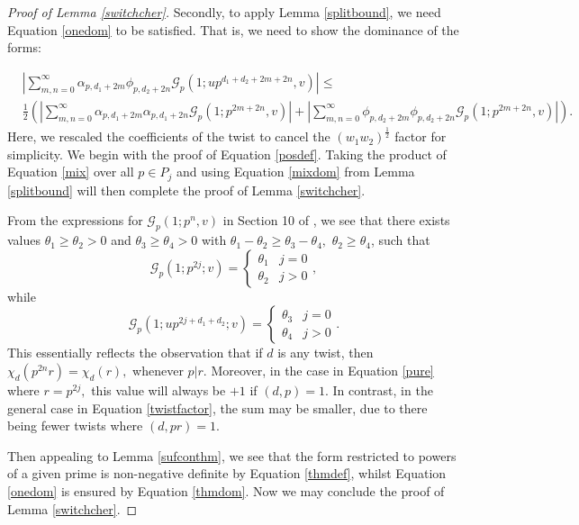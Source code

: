 \documentclass[12pt]{amsart}
\numberwithin{equation}{section}
\numberwithin{thm}{section}
\newcommand{\1}{\mathbf 1}
\begin{document}
\begin{proof}[Proof of Lemma \ref{switchcher}]
		Secondly, to apply Lemma \ref{splitbound}, we need Equation \eqref{onedom}  to be satisfied. That is, we need to show the dominance of the forms:
		
		\begin{align} \label{mix}
			&\nonumber\left|\sum^{\infty}_{m,n=0}\alpha_{p,d_1+2m}\phi_{p,d_2+2n}  \mathcal{G}_p(1;up^{d_1+d_2+2m+2n},v)
			\right|\le\\& \frac{1}{2} \left(\left|\sum^{\infty}_{m,n=0}\alpha_{p,d_1+2m}\alpha_{p,d_1+2n}  \mathcal{G}_p(1;p^{2m+2n},v)
			\right|+\left|\sum^{\infty}_{m,n=0}\phi_{p,d_2+2m}\phi_{p,d_2+2n}  \mathcal{G}_p(1;p^{2m+2n},v)
			\right|\right).
		\end{align}
		Here, we rescaled the coefficients of the twist to cancel the $(w_1w_2)^{\frac{1}{2}} 
		$ factor for simplicity. 
		We begin with the proof of Equation \eqref{posdef}. Taking the product of Equation \eqref{mix} over all $p\in P_j$ and using Equation \eqref{mixdom} from Lemma \ref{splitbound} will then complete the proof of Lemma \ref{switchcher}.
		
		From the expressions for $\mathcal{G}_p(1;p^n,v)$ in Section 10 of \cite{RS2}, we see that there exists  values $\theta_1\ge \theta_2>0$ and $\theta_3\ge\theta_4>0 $ with $\theta_1-\theta_2\ge \theta_3-\theta_4,$ $\theta_2 \ge \theta_4$, such that
		\begin{equation}\label{pure}\mathcal{G}_p(1; p^{2j};v)=\begin{cases} \theta_1& j=0\\
				\theta_2 &j>0\end{cases},
		\end{equation}
		while
		\begin{equation}\label{twistfactor}\mathcal{G}_p(1; up^{2j+d_1+d_2};v)=\begin{cases} \theta_3& j=0\\
				\theta_4 &j>0\end{cases}.
		\end{equation}
		This essentially reflects the observation that if $d$ is any twist, then $\chi_d(p^{2n}r)=\chi_d(r),$  whenever $p|r$. Moreover, in the case in Equation \eqref{pure} where $r=p^{2j},$ this value will always be $+1$ if $(d,p)=1$. In contrast, in the general case in Equation \eqref{twistfactor}, the sum may be smaller, due to there being fewer twists where $(d,pr)=1$. 	
		
		Then appealing to Lemma \ref{sufconthm}, we see that the form restricted to powers of a given prime is non-negative definite by Equation \eqref{thmdef}, whilst Equation \eqref{onedom} is ensured by Equation \eqref{thmdom}.	Now we may conclude the proof of Lemma \ref{switchcher}.  		
	\end{proof}
\end{document}
